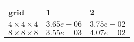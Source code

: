 \begin{tabular}{lll}
\hline
 grid                  & 1          & 2          \\
\hline
 $4 \times 4 \times 4$ & $3.65e-06$ & $3.75e-02$ \\
 $8 \times 8 \times 8$ & $3.55e-03$ & $4.07e-02$ \\
\hline
\end{tabular}